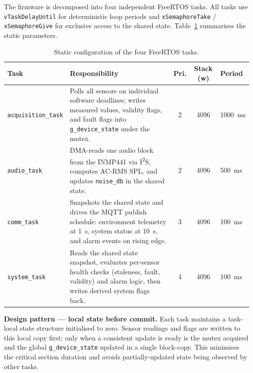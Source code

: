 \documentclass[11pt,a4paper]{article}
\newcommand{\rowhdr}{\rowcolor{tablehdr}}
\begin{document}
The firmware is decomposed into four independent FreeRTOS tasks. All tasks use
\texttt{vTaskDelayUntil} for deterministic loop periods and \texttt{xSemaphoreTake} /
\texttt{xSemaphoreGive} for exclusive access to the shared state. Table~\ref{tab:tasks} summarises
the static parameters.

{\footnotesize
\setlength{\tabcolsep}{4pt}
\renewcommand{\arraystretch}{1.1}

\setlength\LTleft{0pt}
\begin{longtable}{@{}p{3.1cm}p{7.6cm}ccp{2.0cm}@{}}
\caption{Static configuration of the four FreeRTOS tasks.\label{tab:tasks}}\\
\rowhdr
\textbf{Task} & \textbf{Responsibility} & \textbf{Pri.} & \textbf{Stack (w)} & \textbf{Period} \\
\midrule
\endhead
\texttt{acquisition\_task} & Polls all sensors on individual software deadlines; writes measured
  values, validity flags, and fault flags into \texttt{g\_device\_state} under the mutex. & 2 & 4096 & 1000~ms \\
\texttt{audio\_task} & DMA-reads one audio block from the INMP441 via I\textsuperscript{2}S,
  computes AC-RMS SPL, and updates \texttt{noise\_db} in the shared state. & 2 & 4096 & 500~ms \\
\texttt{comm\_task} & Snapshots the shared state and drives the MQTT publish schedule:
  environment telemetry at 1~s, system status at 10~s, and alarm events on rising edge. & 3 & 4096 & 100~ms \\
\texttt{system\_task} & Reads the shared state snapshot, evaluates per-sensor health checks
  (staleness, fault, validity) and alarm logic, then writes derived system flags back. & 4 & 4096 & 100~ms \\
\bottomrule
\end{longtable}
}

\vspace{5pt}
\begin{mdframed}[style=infoboxstyle]
\textbf{Design pattern --- local state before commit.}
Each task maintains a task-local state structure initialised to zero. Sensor readings and flags are
written to this local copy first; only when a consistent update is ready is the mutex acquired and
the global \texttt{g\_device\_state} updated in a single block-copy. This minimises the critical
section duration and avoids partially-updated state being observed by other tasks.
\end{mdframed}
\end{document}
